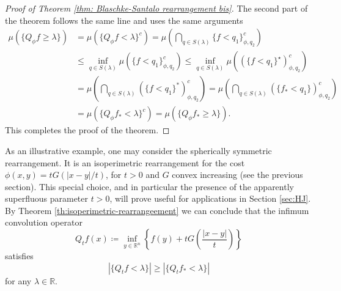 \documentclass[11pt]{article}
\newcommand{\1}{[1]}
\begin{document}
\begin{proof}[Proof of Theorem \ref{thm: Blaschke-Santalo rearrangement bis}]
    The second part of the theorem follows the same line and uses the same arguments
       \begin{align*}
        \mu (\{ Q_\phi f \geq  \lambda \}) 
            &=
        \mu (\{ Q_\phi f <  \lambda \}^c)    
          =       \mu \left( \bigcap_{q \in S(\lambda)} \{ f < q_1 \}_{\phi,q_2}^c \right)
                    \\
            &\leq 
                \inf_{q \in S(\lambda)} \mu  \left( \{ f < q_1 \}_{\phi,q_2}^c \right)
            \leq 
                \inf_{q \in S(\lambda)} \mu  \left( (\{ f < q_1 \}^\star)_{\phi,q_2}^c \right)
                \\
            &=
                \mu \left( \bigcap_{q \in S(\lambda)} (\{ f < q_1 \}^*)_{\phi,q_2}^c \right)
            =
                \mu \left( \bigcap_{q \in S(\lambda)} (\{ f_* < q_1 \})_{\phi,q_2}^c \right)
                    \\
            &=
                \mu (\{ Q_\phi f_* < \lambda \}^c) 
                 =
                 \mu (\{ Q_\phi f_* \geq \lambda \}) 
                 .
    \end{align*}
    This completes the proof of the theorem.
\end{proof}



As an illustrative example, one may consider the spherically symmetric rearrangement. It is an isoperimetric rearrangement for the cost 
$\phi(x,y)=tG(|x-y|/t)$, for $t>0$ and $G$ convex increasing (see the previous section). This special choice, and in particular the presence of the apparently superfluous parameter $t>0$, will prove useful for applications in Section \ref{sec:HJ}. 
By Theorem \ref{th:isoperimetric-rearrangeement} we can conclude that  the infimum convolution operator 
$$
Q_tf(x) \coloneqq \inf_{y \in \mathbb{R}^n} \left\{ f(y) + tG \left(\frac{|x-y|}{t} \right)  \right\}
$$
satisfies
\begin{equation} \label{eq:inf-conv}
|\{ Q_t f < \lambda \}| \geq |\{ Q_t f_* < \lambda \}| 
\end{equation}
for any $\lambda \in \mathbb{R}$.

\end{document}
